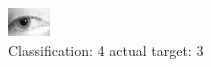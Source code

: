 \begin{figure}[h!]
\begin{center}
\includegraphics[width=0.60\columnwidth]{figures/ID1334_class_4_target_3.png}
\end{center}
\caption{ Classification: 4 actual target: 3}
\label{fig:ID1334_class_4_target_3}
\end{figure}
